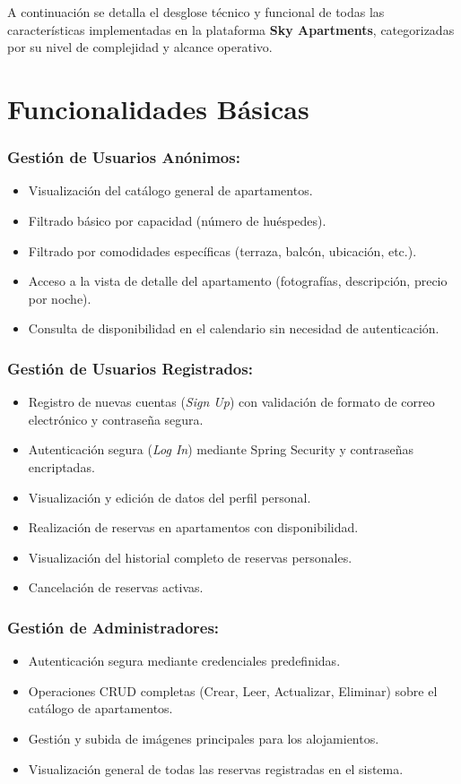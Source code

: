 A continuación se detalla el desglose técnico y funcional de todas las características implementadas en la plataforma \textbf{Sky Apartments}, categorizadas por su nivel de complejidad y alcance operativo.

\section{Funcionalidades Básicas}

\subsubsection{Gestión de Usuarios Anónimos:}
\begin{itemize}
    \item Visualización del catálogo general de apartamentos.
    \item Filtrado básico por capacidad (número de huéspedes).
    \item Filtrado por comodidades específicas (terraza, balcón, ubicación, etc.).
    \item Acceso a la vista de detalle del apartamento (fotografías, descripción, precio por noche).
    \item Consulta de disponibilidad en el calendario sin necesidad de autenticación.
\end{itemize}

\subsubsection{Gestión de Usuarios Registrados:}
\begin{itemize}
    \item Registro de nuevas cuentas (\textit{Sign Up}) con validación de formato de correo electrónico y contraseña segura.
    \item Autenticación segura (\textit{Log In}) mediante Spring Security y contraseñas encriptadas.
    \item Visualización y edición de datos del perfil personal.
    \item Realización de reservas en apartamentos con disponibilidad.
    \item Visualización del historial completo de reservas personales.
    \item Cancelación de reservas activas.
\end{itemize}

\subsubsection{Gestión de Administradores:}
\begin{itemize}
    \item Autenticación segura mediante credenciales predefinidas.
    \item Operaciones CRUD completas (Crear, Leer, Actualizar, Eliminar) sobre el catálogo de apartamentos.
    \item Gestión y subida de imágenes principales para los alojamientos.
    \item Visualización general de todas las reservas registradas en el sistema.
\end{itemize}

